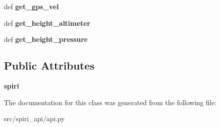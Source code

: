 \begin{DoxyCompactItemize}
\item 
\hypertarget{classspiri__api_1_1api_1_1spiri__api__python_a1941bbe037b37320191c6e81b0c3ff70}{def {\bfseries get\-\_\-gps\-\_\-vel}}\label{classspiri__api_1_1api_1_1spiri__api__python_a1941bbe037b37320191c6e81b0c3ff70}

\item 
\hypertarget{classspiri__api_1_1api_1_1spiri__api__python_a5025edf4df072818a62ed352d74498b7}{def {\bfseries get\-\_\-height\-\_\-altimeter}}\label{classspiri__api_1_1api_1_1spiri__api__python_a5025edf4df072818a62ed352d74498b7}

\item 
\hypertarget{classspiri__api_1_1api_1_1spiri__api__python_a1fa3b9d619658b5cdd03cdc6a956c3f3}{def {\bfseries get\-\_\-height\-\_\-pressure}}\label{classspiri__api_1_1api_1_1spiri__api__python_a1fa3b9d619658b5cdd03cdc6a956c3f3}

\end{DoxyCompactItemize}
\subsection*{\-Public \-Attributes}
\begin{DoxyCompactItemize}
\item 
\hypertarget{classspiri__api_1_1api_1_1spiri__api__python_a94b9a7c31882ffc8f767a6c927f247ca}{{\bfseries spiri}}\label{classspiri__api_1_1api_1_1spiri__api__python_a94b9a7c31882ffc8f767a6c927f247ca}

\end{DoxyCompactItemize}


\-The documentation for this class was generated from the following file\-:\begin{DoxyCompactItemize}
\item 
src/spiri\-\_\-api/api.\-py\end{DoxyCompactItemize}
